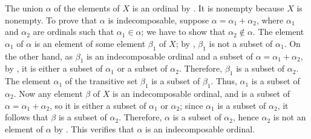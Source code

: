 \documentclass{article}
\begin{document}
\begin{solution}[\ref{exe:6bo4uirh}]
  \label{sol:30t76fdi}
  The union \(\alpha\) of the elements of \(X\) is an ordinal by
  .  It is nonempty because \(X\) is nonempty.  To
  prove that \(\alpha\) is indecomposable, suppose
  \(\alpha = \alpha_1 + \alpha_2\), where \(\alpha_1\) and
  \(\alpha_2\) are ordinals such that \(\alpha_1 \in \alpha\); we have
  to show that \(\alpha_2 \notin \alpha\).  The element \(\alpha_1\)
  of \(\alpha\) is an element of some element \(\beta_1\) of \(X\); by
  , \(\beta_1\) is not a subset of
  \(\alpha_1\).  On the other hand, as \(\beta_1\) is an
  indecomposable ordinal and a subset of
  \(\alpha = \alpha_1 + \alpha_2\), by , it is
  either a subset of \(\alpha_1\) or a subset of \(\alpha_2\).
  Therefore, \(\beta_1\) is a subset of \(\alpha_2\).  The element
  \(\alpha_1\) of the transitive set \(\beta_1\) is a subset of
  \(\beta_1\).  Thus, \(\alpha_1\) is a subset of \(\alpha_2\).  Now
  any element \(\beta\) of \(X\) is an indecomposable ordinal, and is
  a subset of \(\alpha = \alpha_1 + \alpha_2\), so it is either a
  subset of \(\alpha_1\) or \(\alpha_2\); since \(\alpha_1\) is a
  subset of \(\alpha_2\), it follows that \(\beta\) is a subset of
  \(\alpha_2\).  Therefore, \(\alpha\) is a subset of \(\alpha_2\),
  hence \(\alpha_2\) is not an element of \(\alpha\) by
  .  This verifies that \(\alpha\) is
  an indecomposable ordinal.
\end{solution}
\end{document}
